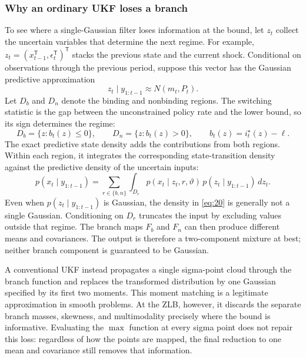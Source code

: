 \documentclass[11pt]{article}
\begin{document}
\subsubsection{Why an ordinary UKF loses a branch}
\label{sec:ukf-branchloss}

To see where a single-Gaussian filter loses information at the bound, let $z_t$ collect the uncertain variables that determine the next regime. For example, $z_t=(x_{t-1}^{\mathsf T},\epsilon_t^{\mathsf T})^{\mathsf T}$ stacks the previous state and the current shock. Conditional on observations through the previous period, suppose this vector has the Gaussian predictive approximation
\begin{equation}\label{eq:18}
 z_t\mid y_{1:t-1}\approx N(m_t,P_t).
\end{equation}
Let $D_b$ and $D_n$ denote the binding and nonbinding regions. The switching statistic is the gap between the unconstrained policy rate and the lower bound, so its sign determines the regime:
\begin{equation}\label{eq:19}
 D_b=\{z:b_t(z)\leq0\},
 \qquad
 D_n=\{z:b_t(z)>0\},
 \qquad
 b_t(z)=i_t^\star(z)-\ell .
\end{equation}
The exact predictive state density adds the contributions from both regions. Within each region, it integrates the corresponding state-transition density against the predictive density of the uncertain inputs:
\begin{equation}\label{eq:20}
 p(x_t\mid y_{1:t-1})
 =\sum_{r\in\{b,n\}}
 \int_{D_r}p(x_t\mid z_t,r,\vartheta)\,
       p(z_t\mid y_{1:t-1})\,dz_t .
\end{equation}
Even when $p(z_t\mid y_{1:t-1})$ is Gaussian, the density in \eqref{eq:20} is generally not a single Gaussian. Conditioning on $D_r$ truncates the input by excluding values outside that regime. The branch maps $F_b$ and $F_n$ can then produce different means and covariances. The output is therefore a two-component mixture at best; neither branch component is guaranteed to be Gaussian.

A conventional UKF instead propagates a single sigma-point cloud through the branch function and replaces the transformed distribution by one Gaussian specified by its first two moments. This moment matching is a legitimate approximation in smooth problems. At the ZLB, however, it discards the separate branch masses, skewness, and multimodality precisely where the bound is informative. Evaluating the $\max$ function at every sigma point does not repair this loss: regardless of how the points are mapped, the final reduction to one mean and covariance still removes that information.
\end{document}
